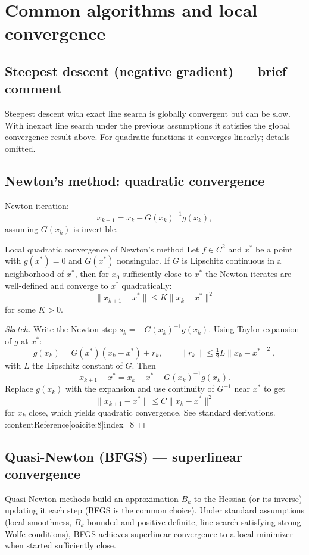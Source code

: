 \documentclass{MathNote}
\begin{document}
\section{Common algorithms and local convergence}

\subsection{Steepest descent (negative gradient) — brief comment}
Steepest descent with exact line search is globally convergent but can be slow. With inexact line search under the previous assumptions it satisfies the global convergence result above. For quadratic functions it converges linearly; details omitted.

\subsection{Newton's method: quadratic convergence}
Newton iteration:
\[
x_{k+1}=x_k - G(x_k)^{-1} g(x_k),
\]
assuming \(G(x_k)\) is invertible.

\begin{theorem}{Local quadratic convergence of Newton's method}{}
Let \(f\in C^2\) and \(x^*\) be a point with \(g(x^*)=0\) and \(G(x^*)\) nonsingular. If \(G\) is Lipschitz continuous in a neighborhood of \(x^*\), then for \(x_0\) sufficiently close to \(x^*\) the Newton iterates are well-defined and converge to \(x^*\) quadratically:
\[
\|x_{k+1}-x^*\|\le K\|x_k-x^*\|^2
\]
for some \(K>0\).
\end{theorem}

\begin{proof}[Sketch]
Write the Newton step \(s_k=-G(x_k)^{-1}g(x_k)\). Using Taylor expansion of \(g\) at \(x^*\):
\[
g(x_k)=G(x^*)(x_k-x^*) + r_k,\qquad \|r_k\|\le \tfrac12 L\|x_k-x^*\|^2,
\]
with \(L\) the Lipschitz constant of \(G\). Then
\[
x_{k+1}-x^* = x_k-x^* - G(x_k)^{-1}g(x_k).
\]
Replace \(g(x_k)\) with the expansion and use continuity of \(G^{-1}\) near \(x^*\) to get
\[
\|x_{k+1}-x^*\| \le C \|x_k-x^*\|^2
\]
for \(x_k\) close, which yields quadratic convergence. See standard derivations. :contentReference[oaicite:8]{index=8}
\end{proof}

\subsection{Quasi-Newton (BFGS) — superlinear convergence}
Quasi-Newton methods build an approximation \(B_k\) to the Hessian (or its inverse) updating it each step (BFGS is the common choice). Under standard assumptions (local smoothness, \(B_k\) bounded and positive definite, line search satisfying strong Wolfe conditions), BFGS achieves superlinear convergence to a local minimizer when started sufficiently close.
\end{document}
